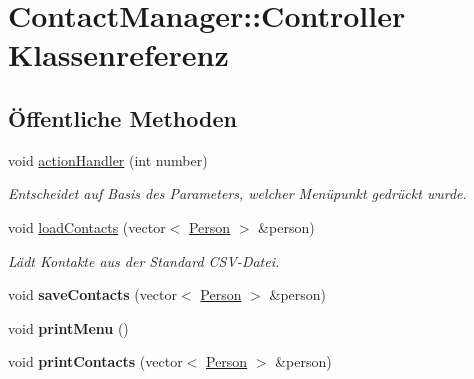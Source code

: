 \hypertarget{classContactManager_1_1Controller}{}\section{Contact\+Manager\+:\+:Controller Klassenreferenz}
\label{classContactManager_1_1Controller}
\subsection*{Öffentliche Methoden}
\begin{DoxyCompactItemize}
\item 
void \hyperlink{classContactManager_1_1Controller_afd2e274df3edef5ab0abf90aae5ad21c}{action\+Handler} (int number)
\begin{DoxyCompactList}\small\item\em Entscheidet auf Basis des Parameters, welcher Menüpunkt gedrückt wurde.\end{DoxyCompactList}\item 
void \hyperlink{classContactManager_1_1Controller_aa10f0286519a294d96077af9eaa7b98c}{load\+Contacts} (vector$<$ \hyperlink{classContactManager_1_1Person}{Person} $>$ \&person)
\begin{DoxyCompactList}\small\item\em Lädt Kontakte aus der Standard C\+S\+V-\/\+Datei.\end{DoxyCompactList}\item 
\mbox{\label{classContactManager_1_1Controller_a9e9c1932416993fd47fcf77601fa7974}} 
void {\bfseries save\+Contacts} (vector$<$ \hyperlink{classContactManager_1_1Person}{Person} $>$ \&person)
\item 
\mbox{\label{classContactManager_1_1Controller_ab36756f7c338b7f7d31fe74ad48f059d}} 
void {\bfseries print\+Menu} ()
\item 
\mbox{\label{classContactManager_1_1Controller_abd46b513b9d71e896fa3187e616aa805}} 
void {\bfseries print\+Contacts} (vector$<$ \hyperlink{classContactManager_1_1Person}{Person} $>$ \&person)
\item 
\mbox{\label{classContactManager_1_1Controller_ad56146eba96b0f1c4f535e978d75a0f2}} 

\end{DoxyCompactItemize}
